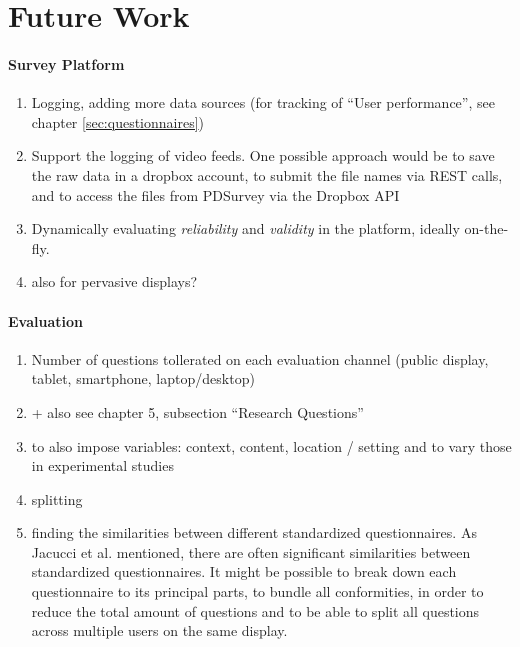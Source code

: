 
\section{Future Work}
\label{sec:future-work}

	

\paragraph{Survey Platform}

	\begin{enumerate}
	\item Logging, adding more data sources (for tracking of ``User performance'', see chapter \ref{sec:questionnaires})
	\item Support the logging of video feeds. One possible approach would be to save the raw data in a dropbox account, to submit the file names via REST calls, and to access the files from PDSurvey via the Dropbox API
	\item Dynamically evaluating \textit{reliability} and \textit{validity} in the platform, ideally on-the-fly.
	\item also for pervasive displays?
	\end{enumerate}


\paragraph{Evaluation}

	\begin{enumerate}
	\item Number of questions tollerated on each evaluation channel (public display, tablet, smartphone, laptop/desktop)
	\item + also see chapter 5, subsection ``Research Questions'' 
	\item to also impose variables: context, content, location / setting and to vary those in experimental studies
	\item splitting 
	\item finding the similarities between different standardized questionnaires. As Jacucci et al. \cite{jacucci2010worldsofinformation} mentioned, there are often significant similarities between standardized questionnaires. It might be possible to break down each questionnaire to its principal parts, to bundle all conformities, in order to reduce the total amount of questions and to be able to split all questions across multiple users on the same display.
	\end{enumerate}


